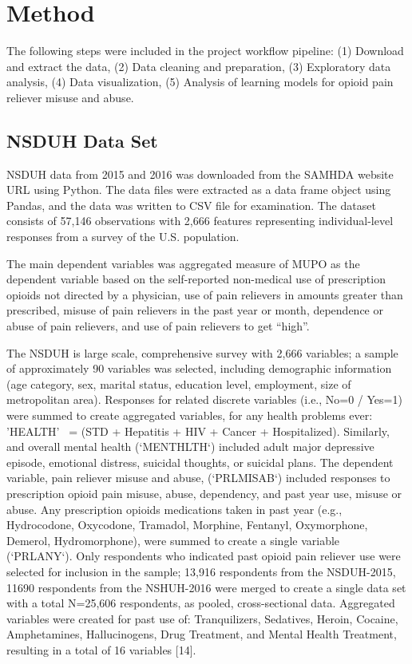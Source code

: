\documentclass[sigconf]{acmart}
\begin{document}
\section{Method}

The following steps were included in the project workflow pipeline: 
(1) Download and extract the data, (2) Data cleaning and preparation, 
(3) Exploratory data analysis, (4) Data visualization, (5) Analysis of 
learning models for opioid pain reliever misuse and abuse.

\subsection{NSDUH Data Set} 

NSDUH data from 2015 and 2016 was downloaded from the SAMHDA website 
\cite{samhsa16} URL using Python. The data files were extracted as a data 
frame object using Pandas, and the data was written to CSV file for 
examination. The dataset consists of 57,146 observations with 2,666 features 
representing individual-level responses from a survey of the U.S. population. 

The main dependent 
variables was aggregated measure of MUPO as the dependent variable based on the self-reported non-medical use of prescription opioids not directed by a physician, use of pain relievers in amounts greater than prescribed, misuse of pain relievers in the past year or month, dependence or abuse of pain relievers, and use of pain relievers to get “high”. 

The NSDUH is large scale, comprehensive survey with 2,666 variables; a sample of approximately 90 variables was selected, including demographic information (age category, sex, marital status, education level, employment, size of metropolitan area). Responses for related discrete variables (i.e., No=0 / Yes=1) were summed to create aggregated variables, for any health problems ever: 'HEALTH'  = (STD + Hepatitis + HIV + Cancer + Hospitalized). Similarly, and overall mental health (`MENTHLTH`) included adult major depressive episode, emotional distress, suicidal thoughts, or suicidal plans. 
The dependent variable, pain reliever misuse and abuse, (`PRLMISAB`) included responses to prescription opioid pain misuse, abuse, dependency, and past year use, misuse or abuse. Any prescription opioids medications taken in past year (e.g., Hydrocodone, Oxycodone, Tramadol, Morphine, Fentanyl, Oxymorphone, Demerol, Hydromorphone), were summed to create a single variable (`PRLANY`). Only respondents who indicated past opioid pain reliever use were selected for inclusion in the sample; 13,916 respondents from the NSDUH-2015, 11690 respondents from the NSHUH-2016 were merged to create a single data set with a total N=25,606 respondents, as pooled, cross-sectional data. Aggregated variables were created for past use of: Tranquilizers, Sedatives, Heroin, Cocaine, Amphetamines, Hallucinogens, Drug Treatment, and Mental Health Treatment, resulting in a total of 16 variables [14]. 
\end{document}
